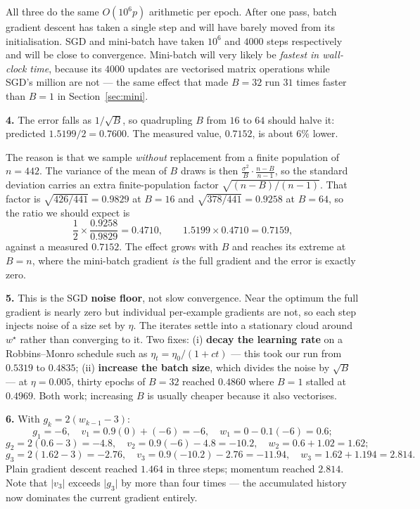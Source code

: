 \documentclass[11pt]{article}
\begin{document}
All three do the same $O(10^6 p)$ arithmetic per epoch. After one pass, batch
gradient descent has taken a single step and will have barely moved from its
initialisation. SGD and mini-batch have taken $10^6$ and $4000$ steps
respectively and will be close to convergence. Mini-batch will very likely be
\emph{fastest in wall-clock time}, because its $4000$ updates are vectorised
matrix operations while SGD's million are not --- the same effect that made
$B{=}32$ run $31$ times faster than $B{=}1$ in Section~\ref{sec:mini}.

\medskip
\textbf{4.} The error falls as $1/\sqrt{B}$, so quadrupling $B$ from $16$ to
$64$ should halve it: predicted $1.5199/2 = 0.7600$. The measured value,
$0.7152$, is about $6\%$ lower.

The reason is that we sample \emph{without} replacement from a finite
population of $n = 442$. The variance of the mean of $B$ draws is then
$\frac{\sigma^2}{B}\cdot\frac{n-B}{n-1}$, so the standard deviation carries an
extra finite-population factor $\sqrt{(n-B)/(n-1)}$. That factor is
$\sqrt{426/441} = 0.9829$ at $B=16$ and $\sqrt{378/441} = 0.9258$ at $B=64$, so
the ratio we should expect is
\[
  \frac{1}{2}\times\frac{0.9258}{0.9829} = 0.4710,
  \qquad
  1.5199 \times 0.4710 = 0.7159,
\]
against a measured $0.7152$. The effect grows with $B$ and reaches its extreme
at $B = n$, where the mini-batch gradient \emph{is} the full gradient and the
error is exactly zero.

\medskip
\textbf{5.} This is the SGD \textbf{noise floor}, not slow convergence. Near
the optimum the full gradient is nearly zero but individual per-example
gradients are not, so each step injects noise of a size set by $\eta$. The
iterates settle into a stationary cloud around $w^\star$ rather than
converging to it. Two fixes: (i) \textbf{decay the learning rate} on a
Robbins--Monro schedule such as $\eta_t = \eta_0/(1+ct)$ --- this took our run
from $0.5319$ to $0.4835$; (ii) \textbf{increase the batch size}, which divides
the noise by $\sqrt{B}$ --- at $\eta = 0.005$, thirty epochs of $B=32$ reached
$0.4860$ where $B=1$ stalled at $0.4969$. Both
work; increasing $B$ is usually cheaper because it also vectorises.

\medskip
\textbf{6.} With $g_k = 2(w_{k-1}-3)$:
\[
  g_1 = -6, \quad v_1 = 0.9(0) + (-6) = -6, \quad w_1 = 0 - 0.1(-6) = 0.6;
\]
\[
  g_2 = 2(0.6-3) = -4.8, \quad v_2 = 0.9(-6) - 4.8 = -10.2, \quad
  w_2 = 0.6 + 1.02 = 1.62;
\]
\[
  g_3 = 2(1.62-3) = -2.76, \quad v_3 = 0.9(-10.2) - 2.76 = -11.94, \quad
  w_3 = 1.62 + 1.194 = 2.814 .
\]
Plain gradient descent reached $1.464$ in three steps; momentum reached
$2.814$. Note that $\lvert v_3 \rvert$ exceeds $\lvert g_3\rvert$ by more than
four times --- the accumulated history now dominates the current gradient
entirely.
\end{document}
